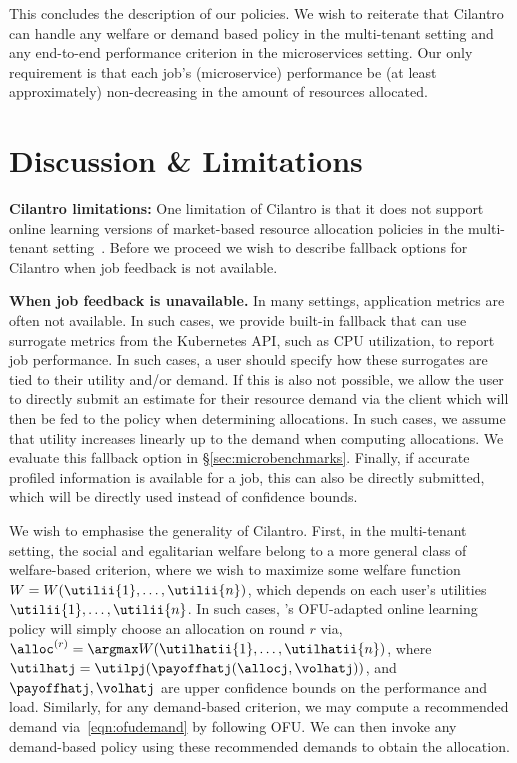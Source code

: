 

This concludes the description of our policies.
We wish to reiterate that Cilantro can handle any welfare or demand based policy in the multi-tenant
setting and any end-to-end performance criterion in the microservices setting.
Our only requirement is that each job's (microservice) performance be
(at least approximately) non-decreasing in the amount
of resources allocated.

\section{Discussion \& Limitations}
\label{sec:cilantro_discussion}


\textbf{Cilantro limitations:}
One limitation of Cilantro is that it
does not support online learning versions of market-based resource allocation
policies in the multi-tenant setting~\citep{zahedi2018amdahl,lai2005tycoon,varian1973equity}.
Before we proceed we wish to describe fallback options for Cilantro when job feedback is not
available.


\textbf{When job feedback is unavailable.}
In many settings, application metrics are often not available. In such cases,
we provide built-in fallback
that can use surrogate metrics from the Kubernetes API, such as CPU utilization, to report job
performance.
In such cases, a user should specify how these surrogates are tied to their utility
and/or demand.
If this is also not possible, we allow the user to directly submit an estimate for their resource
demand via the client which will then be fed to the policy when determining allocations.
In such cases, we assume that utility increases linearly up to the demand when computing
allocations.
We evaluate this fallback option in \S\ref{sec:microbenchmarks}.
Finally, if accurate profiled information is available for a job,
this can also be directly submitted, which will be directly used instead of confidence bounds.


We wish to emphasise the generality of Cilantro.
First, in the multi-tenant setting,
the social and egalitarian welfare belong to a more general class of
welfare-based criterion, where we wish to maximize some welfare function
$W = W(\utilii{1},\dots,\utilii{n})$,
which depends on each user's utilities $\utilii{1},\dots,\utilii{n}$.
In such cases, \cilantro's OFU-adapted online learning policy will simply choose an
allocation on round $r$ via, $\alloc^{(r)}= \argmax W(\utilhatii{1},\dots,\utilhatii{n})$,
where
$\utilhatj = \utilpj(\payoffhatj(\allocj, \volhatj))$,
and $\payoffhatj, \volhatj$ are upper confidence bounds on the performance and load.
Similarly,
for any demand-based criterion, 
we may compute a recommended demand via~\eqref{eqn:ofudemand} by following OFU.
We can then invoke any
demand-based policy using these recommended demands to obtain the allocation.

